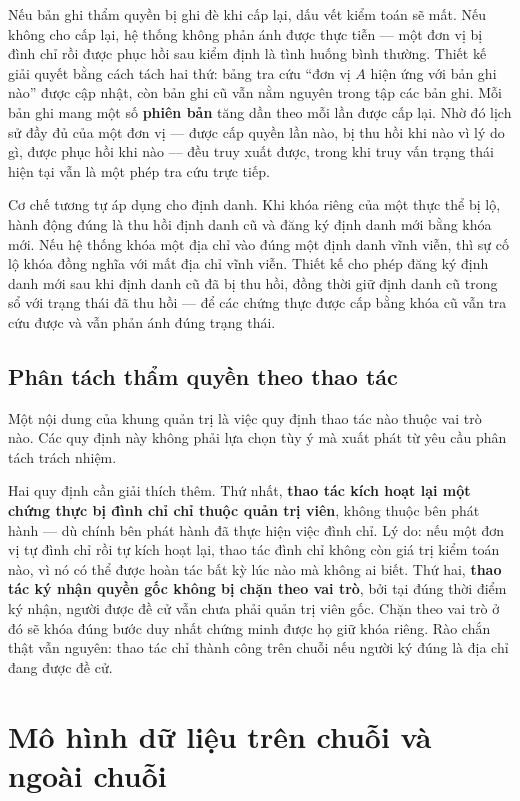 Nếu bản ghi thẩm quyền bị ghi đè khi cấp lại, dấu vết kiểm toán sẽ mất. Nếu không cho cấp lại, hệ thống không phản ánh được thực tiễn --- một đơn vị bị đình chỉ rồi được phục hồi sau kiểm định là tình huống bình thường. Thiết kế giải quyết bằng cách tách hai thứ: bảng tra cứu {``}đơn vị $A$ hiện ứng với bản ghi nào{''} được cập nhật, còn bản ghi cũ vẫn nằm nguyên trong tập các bản ghi. Mỗi bản ghi mang một số \textbf{phiên bản} tăng dần theo mỗi lần được cấp lại. Nhờ đó lịch sử đầy đủ của một đơn vị --- được cấp quyền lần nào, bị thu hồi khi nào vì lý do gì, được phục hồi khi nào --- đều truy xuất được, trong khi truy vấn trạng thái hiện tại vẫn là một phép tra cứu trực tiếp.

Cơ chế tương tự áp dụng cho định danh. Khi khóa riêng của một thực thể bị lộ, hành động đúng là thu hồi định danh cũ và đăng ký định danh mới bằng khóa mới. Nếu hệ thống khóa một địa chỉ vào đúng một định danh vĩnh viễn, thì sự cố lộ khóa đồng nghĩa với mất địa chỉ vĩnh viễn. Thiết kế cho phép đăng ký định danh mới sau khi định danh cũ đã bị thu hồi, đồng thời giữ định danh cũ trong sổ với trạng thái đã thu hồi --- để các chứng thực được cấp bằng khóa cũ vẫn tra cứu được và vẫn phản ánh đúng trạng thái.

\subsection{Phân tách thẩm quyền theo thao tác}

Một nội dung của khung quản trị là việc quy định thao tác nào thuộc vai trò nào. Các quy định này không phải lựa chọn tùy ý mà xuất phát từ yêu cầu phân tách trách nhiệm.



Hai quy định cần giải thích thêm. Thứ nhất, \textbf{thao tác kích hoạt lại một chứng thực bị đình chỉ chỉ thuộc quản trị viên}, không thuộc bên phát hành --- dù chính bên phát hành đã thực hiện việc đình chỉ. Lý do: nếu một đơn vị tự đình chỉ rồi tự kích hoạt lại, thao tác đình chỉ không còn giá trị kiểm toán nào, vì nó có thể được hoàn tác bất kỳ lúc nào mà không ai biết. Thứ hai, \textbf{thao tác ký nhận quyền gốc không bị chặn theo vai trò}, bởi tại đúng thời điểm ký nhận, người được đề cử vẫn chưa phải quản trị viên gốc. Chặn theo vai trò ở đó sẽ khóa đúng bước duy nhất chứng minh được họ giữ khóa riêng. Rào chắn thật vẫn nguyên: thao tác chỉ thành công trên chuỗi nếu người ký đúng là địa chỉ đang được đề cử.

\section{Mô hình dữ liệu trên chuỗi và ngoài chuỗi}

